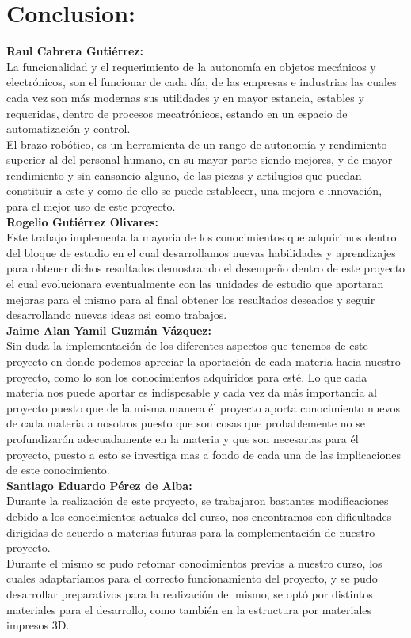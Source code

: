 \documentclass[14pt,a4paper]{article}
\begin{document}
\section{Conclusion:}
\textbf{Raul Cabrera Gutiérrez:}\\
La funcionalidad y el requerimiento de la autonomía en objetos mecánicos y electrónicos, son el funcionar de cada día, de las empresas e industrias las cuales cada vez son más modernas sus utilidades y en mayor estancia, estables y requeridas, dentro de procesos mecatrónicos, estando en un espacio de automatización y control.\\
El brazo robótico, es un herramienta de un rango de autonomía y rendimiento superior al del personal humano, en su mayor parte siendo mejores, y de mayor rendimiento y sin cansancio alguno, de las piezas y artilugios que puedan constituir a este y como de ello se puede establecer, una mejora e innovación, para el mejor uso de este proyecto.\\

\textbf{Rogelio Gutiérrez Olivares:}\\
Este trabajo implementa la mayoria de los conocimientos que adquirimos dentro del bloque de estudio en el cual desarrollamos nuevas habilidades y aprendizajes para obtener dichos resultados demostrando el desempeño dentro de este proyecto el cual evolucionara eventualmente con las unidades de estudio que aportaran mejoras para el mismo para al final obtener los resultados deseados y seguir desarrollando nuevas ideas asi como trabajos.\\

\textbf{Jaime Alan Yamil Guzmán Vázquez:}\\
Sin duda la implementación de los diferentes aspectos que tenemos de este proyecto en donde podemos apreciar la aportación de cada materia hacia nuestro proyecto, como lo son los conocimientos adquiridos para esté. Lo que cada materia nos puede aportar es indispesable y cada vez da más importancia al proyecto puesto que de la misma manera él proyecto aporta conocimiento nuevos de cada materia a nosotros puesto que son cosas que probablemente no se profundizarón adecuadamente en la materia y que son necesarias para él proyecto, puesto a esto se investiga mas a fondo de cada una de las implicaciones de este conocimiento.\\

\textbf{Santiago Eduardo Pérez de Alba:}\\
Durante la realización de este proyecto, se trabajaron bastantes modificaciones debido a los conocimientos actuales del curso, nos encontramos con dificultades dirigidas de acuerdo a materias futuras para la complementación de nuestro proyecto.\\
Durante el mismo se pudo retomar conocimientos previos a nuestro curso, los cuales adaptaríamos para el correcto funcionamiento del proyecto, y se pudo desarrollar preparativos para la realización del mismo, se optó por distintos materiales para el desarrollo, como también en la estructura por materiales impresos 3D.\\
\end{document}
